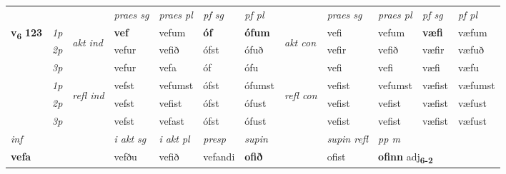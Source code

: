\begin{longtable}[l]{X>{\footnotesize\itshape}llXXXXlXXXX}
 & &   & \textit{praes sg}  & \textit{praes pl}    & \textit{ pf sg} & \textit{pf pl} & & \textit{praes sg}  & \textit{praes pl}    & \textit{pf sg} & \textit{pf pl }  \\ \cmidrule{4-7} \cmidrule{9-12}
 \multirow{2}{*}{{{\textbf{v{\textsubscript{6}}} \Large{\textbf{123}}}}}  & 1p & \multirow{3}{*}{\begin{turn}{90}\textit{akt ind}\end{turn}} & \textbf{vef} & vefum & \textbf{óf} & \textbf{ófum} & \multirow{3}{*}{\begin{turn}{90}\textit{akt con}\end{turn}} &vefi & vefum & \textbf{væfi} & væfum\\*
 & 2p &  &  vefur  & vefið & ófst & ófuð & & vefir & vefið & væfir & væfuð \\*
 & 3p &  & vefur & vefa & óf & ófu & & vefi & vefi& væfi & væfu \\*
\cmidrule{4-7} \cmidrule{9-12}
 & 1p & \multirow{3}{*}{\begin{turn}{90}\textit{refl ind}\end{turn}}  & vefst & vefumst & ófst & ófumst & \multirow{3}{*}{\begin{turn}{90}\textit{refl con}\end{turn}}  &vefist & vefumst & væfist & væfumst \\*
 & 2p &  & vefst & vefist & ófst & ófust & &vefist & vefist & væfist & væfust \\*
 & 3p  & & vefst & vefast & ófst & ófust & & vefist & vefist& væfist & væfust \\*
\cmidrule{4-7} \cmidrule{9-12}

   {\textit{inf}} & &  & \textit{i akt sg} & \textit{i akt pl}   & \textit{presp} & \textit{supin} && \textit{supin refl} & \textit{pp m} \\*
  {\textbf{vefa}} & && vefðu  & vefið   & vefandi &  \textbf{ofið} && ofist & \multicolumn{2}{l}{\textbf{ofinn} adj\textbf{\textsubscript{6-2}}} \\*

\midrule


\end{longtable}
